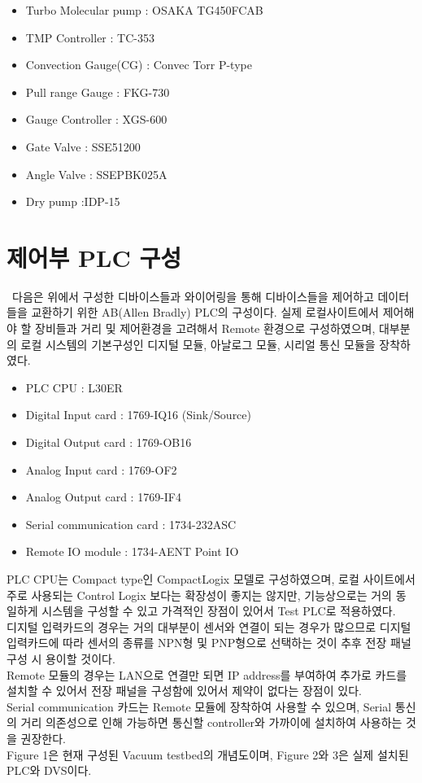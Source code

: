 \documentclass[11pt
  , a4paper
  , article
  , oneside
]{memoir}
\begin{document}
\begin{itemize}
\item Turbo Molecular pump 	: OSAKA TG450FCAB
\item TMP Controller	    : TC-353
\item Convection Gauge(CG)  : Convec Torr P-type
\item Pull range Gauge      : FKG-730
\item Gauge Controller      : XGS-600
\item Gate Valve            : SSE51200
\item Angle Valve           : SSEPBK025A
\item Dry pump				:IDP-15
\end{itemize}


\section{제어부 PLC 구성}\
다음은 위에서 구성한 디바이스들과 와이어링을 통해 디바이스들을 제어하고 데이터들을 교환하기 위한 AB(Allen Bradly) PLC의 구성이다. 실제 로컬사이트에서 제어해야 할 장비들과 거리 및 제어환경을 고려해서 Remote 환경으로 구성하였으며, 대부분의 로컬 시스템의 기본구성인 디지털 모듈, 아날로그 모듈, 시리얼 통신 모듈을 장착하였다.

\begin{itemize}
\item PLC CPU	 			: L30ER
\item Digital Input card	: 1769-IQ16 (Sink/Source) 
\item Digital Output card	: 1769-OB16 
\item Analog Input card		: 1769-OF2 
\item Analog Output card	: 1769-IF4 
\item Serial communication card	: 1734-232ASC 
\item Remote IO module			: 1734-AENT Point IO 
\end{itemize}

PLC CPU는 Compact type인 CompactLogix 모델로 구성하였으며, 로컬 사이트에서 주로 사용되는 Control Logix 보다는 확장성이 좋지는 않지만, 기능상으로는 거의 동일하게 시스템을 구성할 수 있고 가격적인 장점이 있어서 Test PLC로 적용하였다.\\
디지털 입력카드의 경우는 거의 대부분이 센서와 연결이 되는 경우가 많으므로 디지털 입력카드에 따라 센서의 종류를 NPN형 및 PNP형으로 선택하는 것이 추후 전장 패널구성 시 용이할 것이다.\\
Remote 모듈의 경우는 LAN으로 연결만 되면 IP address를 부여하여 추가로 카드를 설치할 수 있어서 전장 패널을 구성함에 있어서 제약이 없다는 장점이 있다.\\
Serial communication 카드는 Remote 모듈에 장착하여 사용할 수 있으며, Serial 통신의 거리 의존성으로 인해 가능하면 통신할 controller와 가까이에 설치하여 사용하는 것을 권장한다.
\\
\newline
Figure 1은 현재 구성된 Vacuum testbed의 개념도이며, Figure 2와 3은 실제 설치된 PLC와 DVS이다.\\
\end{document}
